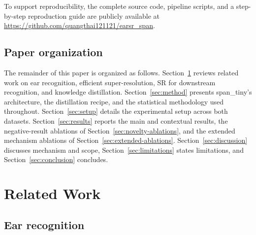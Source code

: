 \documentclass[pdflatex,sn-vancouver-num]{sn-jnl}
\begin{document}
To support reproducibility, the complete source code, pipeline scripts, and a step-by-step reproduction guide are publicly available at \url{https://github.com/quangthai121121/earsr_span}.

\subsection{Paper organization}

The remainder of this paper is organized as follows. Section~\ref{sec:related} reviews related work on ear recognition, efficient super-resolution, SR for downstream recognition, and knowledge distillation. Section~\ref{sec:method} presents span\_tiny's architecture, the distillation recipe, and the statistical methodology used throughout. Section~\ref{sec:setup} details the experimental setup across both datasets. Section~\ref{sec:results} reports the main and contextual results, the negative-result ablations of Section~\ref{sec:novelty-ablations}, and the extended mechanism ablations of Section~\ref{sec:extended-ablations}. Section~\ref{sec:discussion} discusses mechanism and scope, Section~\ref{sec:limitations} states limitations, and Section~\ref{sec:conclusion} concludes.

\section{Related Work}
\label{sec:related}

\subsection{Ear recognition}
\end{document}
